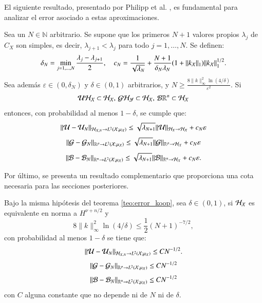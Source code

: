 El siguiente resultado, presentado por Philipp et al. \cite{Philipp2024ErrorOperator}, es fundamental para analizar el error asociado a estas aproximaciones.
\begin{teo}
    Sea un \( N \in \mathbb{N} \) arbitrario. Se supone que los primeros \( N + 1 \) valores propios \( \lambda_j \) de \( C_X \) son simples, es decir, \( \lambda_{j+1} < \lambda_j \) para todo \( j = 1, \ldots, N \). Se definen:
    \[
    \delta_N = \min_{j=1, \ldots, N} \frac{\lambda_j - \lambda_{j+1}}{2}, \quad c_N = \frac{1}{\sqrt{\lambda_N}} + \frac{N + 1}{\delta_N \lambda_N} (1 + \|k_{\mathcal{X}}\|_{1}) \|k_{\mathcal{X}} \|^{1/2}_{1}.
    \]
    Sea además \( \varepsilon \in (0, \delta_N) \) y \( \delta \in (0, 1) \) arbitrarios, y \( N \geq  \frac{8\|k\|^2_\infty \ln(4/\delta)}{\varepsilon^2} \). Si 
    \begin{equation*}
        \mathcal{U} \mathcal{H}_{\mathcal{X}} \subset \mathcal{H}_{\mathcal{X}}, \, \mathcal{G} \mathcal{H}_{\mathcal{Y}} \subset \mathcal{H}_{\mathcal{X}}, \, \mathcal{B} \mathbb{R}^n \subset \mathcal{H}_{\mathcal{X}}
    \end{equation*}
    entonces, con probabilidad al menos \( 1 - \delta \), se cumple que:
    \[
    \|\mathcal{U} - \mathcal{U}_N \|_{\mathcal{H}_{\mathcal{X}, N} \to L^2(\mathcal{X}; \mu_{\mathcal{X}})} \leq \sqrt{\lambda_{N+1}} \|\mathcal{U} \|_{\mathcal{H}_{X} \to \mathcal{H_{\mathcal{X}}}} + c_N \varepsilon
    \]
    \[
    \|\mathcal{G} - \mathcal{G}_N \|_{\mathbb{R}^p \to L^2(\mathcal{X}; \mu_{\mathcal{X}})} \leq \sqrt{\lambda_{N+1}} \|\mathcal{G} \|_{\mathbb{R}^p \to \mathcal{H_{\mathcal{X}}}} + c_N \varepsilon
    \]
    \[
    \|\mathcal{B} - \mathcal{B}_N \|_{\mathbb{R}^n \to L^2(\mathcal{X}; \mu_{\mathcal{X}})} \leq \sqrt{\lambda_{N+1}} \|\mathcal{B} \|_{\mathbb{R}^n \to \mathcal{H_{\mathcal{X}}}} + c_N \varepsilon.
    \]
    \label{teo:error_koop}
\end{teo}

Por último, se presenta un resultado complementario que proporciona una cota necesaria para las secciones posteriores.

\begin{teo}
    Bajo la misma hipótesis del teorema \ref{teo:error_koop}, sea $\delta \in (0, 1)$,  si $\mathcal{H}_{\mathcal{X}}$ es equivalente en norma a $H^{\nu + n/2}$ y
    \[
    8\|k\|^2_\infty \ln(4/\delta) \leq \frac{1}{2} (N+1)^{-7/2},
    \]
    con probabilidad al menos $1 - \delta$ se tiene que:
    \begin{equation}
        \| \mathcal{U} - \mathcal{U}_N \|_{\mathcal{H}_{\mathcal{X}, N} \to L^2(\mathcal{X}; \mu_{\mathcal{X}})} \leq C N^{-1/2}.
        \label{eq:kEDMD_bound}
    \end{equation}
    \begin{equation*}
    \| \mathcal{G} - \mathcal{G}_N \|_{\mathbb{R}^p \to L^2(\mathcal{X}; \mu_{\mathcal{X}})} \leq C N^{-1/2}
    \end{equation*}
    \begin{equation*}
    \| \mathcal{B} - \mathcal{B}_N \|_{\mathbb{R}^n \to L^2(\mathcal{X}; \mu_{\mathcal{X}})} \leq C N^{-1/2}
    \end{equation*}
    con $C$ alguna constante que no depende ni de $N$ ni de $\delta$.
    \label{teo:error_koop_sqrt_N_hip}
\end{teo}

